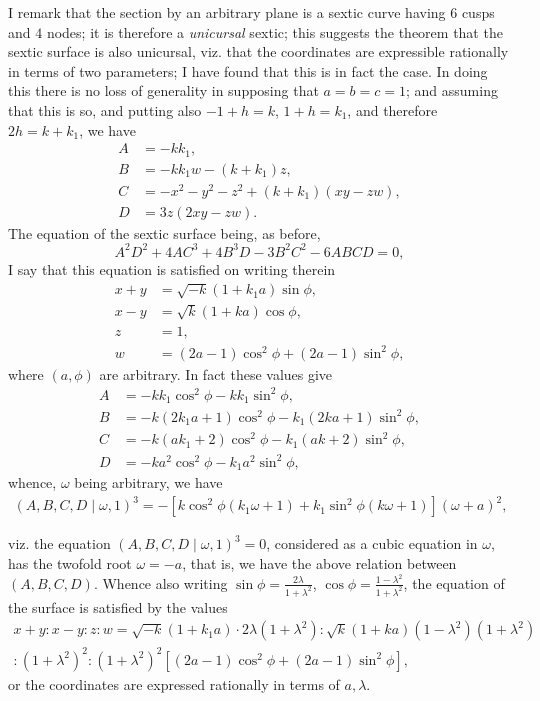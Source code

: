 \documentclass[12pt,a4paper]{article}
\begin{document}
I remark that the section by an arbitrary plane is a sextic curve having $6$ cusps and $4$ nodes; it is therefore a \textit{unicursal} sextic; this suggests the theorem that the sextic surface is also unicursal, viz. that the coordinates are expressible rationally in terms of two parameters; I have found that this is in fact the case. In doing this there is no loss of generality in supposing that $a = b = c = 1$; and assuming that this is so, and putting also $-1 + h = k$, $1 + h = k_1$, and therefore $2h = k + k_1$, we have
\begin{align*}
A &= -kk_1,\\
B &= -kk_1 w - (k + k_1)z,\\
C &= -x^2 - y^2 - z^2 + (k + k_1)(xy - zw),\\
D &= 3z(2xy - zw).
\end{align*}
The equation of the sextic surface being, as before,
\[
A^2D^2 + 4AC^3 + 4B^3D - 3B^2C^2 - 6ABCD = 0,
\]
I say that this equation is satisfied on writing therein
\begin{align*}
x + y &= \sqrt{-k}(1 + k_1a)\sin\phi,\\
x - y &= \sqrt{k}(1 + ka)\cos\phi,\\
z &= 1,\\
w &= (2a - 1)\cos^2\phi + (2a - 1)\sin^2\phi,
\end{align*}
where $(a, \phi)$ are arbitrary. In fact these values give
\begin{align*}
A &= -kk_1\cos^2\phi - kk_1\sin^2\phi,\\
B &= -k(2k_1a + 1)\cos^2\phi - k_1(2ka + 1)\sin^2\phi,\\
C &= -k(ak_1 + 2)\cos^2\phi - k_1(ak + 2)\sin^2\phi,\\
D &= -ka^2\cos^2\phi - k_1a^2\sin^2\phi,
\end{align*}
whence, $\omega$ being arbitrary, we have
\begin{multline*}
(A, B, C, D \mid \omega, 1)^3 = -[k\cos^2\phi(k_1\omega + 1) + k_1\sin^2\phi(k\omega + 1)](\omega + a)^2,
\end{multline*}

viz. the equation $(A, B, C, D \mid \omega, 1)^3 = 0$, considered as a cubic equation in $\omega$, has the twofold root $\omega = -a$, that is, we have the above relation between $(A, B, C, D)$. Whence also writing $\sin\phi = \tfrac{2\lambda}{1 + \lambda^2}$, $\cos\phi = \tfrac{1 - \lambda^2}{1 + \lambda^2}$, the equation of the surface is satisfied by the values
\begin{multline*}
x + y : x - y : z : w = \sqrt{-k}(1 + k_1a) \cdot 2\lambda(1 + \lambda^2) : \sqrt{k}(1 + ka)(1 - \lambda^2)(1 + \lambda^2)\\
: (1 + \lambda^2)^2 : (1 + \lambda^2)^2[(2a - 1)\cos^2\phi + (2a - 1)\sin^2\phi],
\end{multline*}
or the coordinates are expressed rationally in terms of $a, \lambda$.
\end{document}
